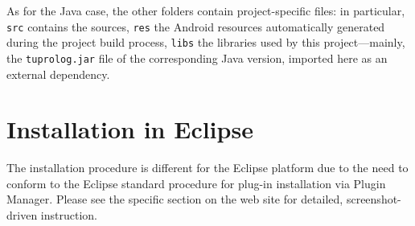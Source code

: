 As for the Java case, the other folders contain project-specific files: in particular, \texttt{src} contains the sources, \texttt{res} the Android resources automatically generated during the project build process, \texttt{libs} the libraries used by this project---mainly, the \texttt{tuprolog.jar} file of the corresponding Java version, imported here as an external dependency.


\section{Installation in Eclipse}

The installation procedure is different for the Eclipse platform due to the need to conform to the Eclipse standard procedure for plug-in installation via Plugin Manager.
Please see the specific section on the \tuprolog{} web site for detailed, screenshot-driven instruction. 